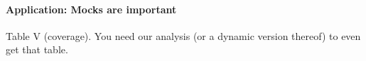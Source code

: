 \paragraph{Application: Mocks are important} Table V (coverage). You need our analysis (or a dynamic version thereof) to even get that table.










